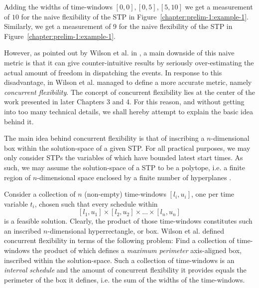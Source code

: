 	\begin{example}
		Adding the widths of time-windows $[0,0], [0,5], [5,10]$ we get a measurement of $10$ 
		for the naive flexibility of the STP in Figure~\ref{chapter:prelim-1:example-1}.
		Similarly, we get a measurement of 9 for the naive flexibility of the STP in Figure~\ref{chapter:prelim-1:example-1}.
	\end{example}
	
	However, as pointed out by Wilson et al. in \cite{wilson:2014}, a main downside of this naive metric is that it can
	give counter-intuitive results by seriously over-estimating the actual amount of freedom in dispatching the events.
	In response to this disadvantage, in \cite{wilson:2014} Wilson et al. 
	managed to define a more accurate metric, namely \emph{concurrent flexibility}.
	The concept of concurrent flexibility lies at the center of the work presented in later Chapters 3 and 4.
	For this reason, and without getting into too many technical details,
	we shall hereby attempt to explain the basic idea behind it.

	The main idea behind concurrent flexibility is that of inscribing a $n$-dimensional box within the solution-space of a given STP.
	For all practical purposes, we may only consider STPs the variables of which have bounded latest start times.
	As such, we may assume the solution-space of a STP to be a polytope,
	i.e.  a finite region of $n$-dimensional space enclosed by a finite number of hyperplanes \cite{coxeter1940regular}.

	Consider a collection of $n$ (non-empty) time-windows $[l_i, u_i]$, one per time variable $t_i$,
	chosen such that every schedule within $$[l_1, u_1] \times [l_2, u_2] \times \ldots \times [l_n, u_n]$$ is a feasible solution.
	Clearly, the product of those time-windows constitutes such an inscribed $n$-dimensional hyperrectangle, or box.
	Wilson et al. defined concurrent flexibility in terms of the following problem:
	Find a collection of time-windows the product of which defines a \emph{maximum perimeter} axis-aligned box, inscribed within the solution-space.
	Such a collection of time-windows is an \emph{interval schedule} and the amount of concurrent flexibility it provides
	equals the perimeter of the box it defines, i.e. the sum of the widths of the time-windows.


